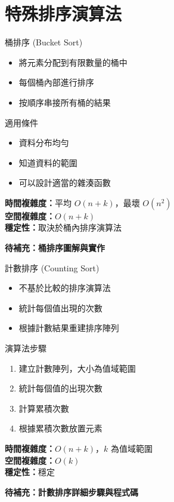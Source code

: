 \documentclass{beamer}
\begin{document}
\section{特殊排序演算法}

\begin{frame}{桶排序 (Bucket Sort)}
\begin{itemize}
    \item 將元素分配到有限數量的桶中
    \item 每個桶內部進行排序
    \item 按順序串接所有桶的結果
\end{itemize}

\vspace{1em}
\begin{block}{適用條件}
\begin{itemize}
    \item 資料分布均勻
    \item 知道資料的範圍
    \item 可以設計適當的雜湊函數
\end{itemize}
\end{block}

\vspace{1em}
\textbf{時間複雜度：}平均 $O(n+k)$，最壞 $O(n^2)$\\
\textbf{空間複雜度：}$O(n+k)$\\
\textbf{穩定性：}取決於桶內排序演算法

\vspace{1em}
\textbf{待補充：桶排序圖解與實作}
\end{frame}

\begin{frame}{計數排序 (Counting Sort)}
\begin{itemize}
    \item 不基於比較的排序演算法
    \item 統計每個值出現的次數
    \item 根據計數結果重建排序陣列
\end{itemize}

\vspace{1em}
\begin{block}{演算法步驟}
\begin{enumerate}
    \item 建立計數陣列，大小為值域範圍
    \item 統計每個值的出現次數
    \item 計算累積次數
    \item 根據累積次數放置元素
\end{enumerate}
\end{block}

\vspace{1em}
\textbf{時間複雜度：}$O(n+k)$，$k$ 為值域範圍\\
\textbf{空間複雜度：}$O(k)$\\
\textbf{穩定性：}穩定

\vspace{1em}
\textbf{待補充：計數排序詳細步驟與程式碼}
\end{frame}
\end{document}
